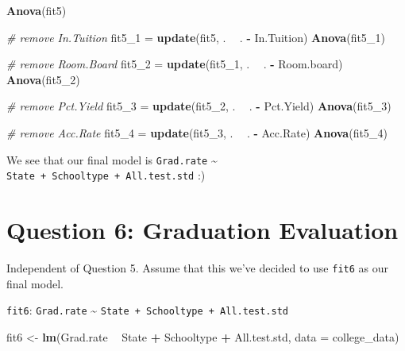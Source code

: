 \documentclass[]{article}
\newenvironment{Shaded}{\begin{snugshade}}{\end{snugshade}}
\newcommand{\KeywordTok}[1]{\textcolor[rgb]{0.13,0.29,0.53}{\textbf{#1}}}
\newcommand{\DataTypeTok}[1]{\textcolor[rgb]{0.13,0.29,0.53}{#1}}
\newcommand{\DecValTok}[1]{\textcolor[rgb]{0.00,0.00,0.81}{#1}}
\newcommand{\StringTok}[1]{\textcolor[rgb]{0.31,0.60,0.02}{#1}}
\newcommand{\CommentTok}[1]{\textcolor[rgb]{0.56,0.35,0.01}{\textit{#1}}}
\newcommand{\OperatorTok}[1]{\textcolor[rgb]{0.81,0.36,0.00}{\textbf{#1}}}
\newcommand{\NormalTok}[1]{#1}
\begin{document}
\begin{Shaded}
\begin{Highlighting}[]
\KeywordTok{Anova}\NormalTok{(fit5)}

\CommentTok{# remove In.Tuition}
\NormalTok{fit5_}\DecValTok{1}\NormalTok{ =}\StringTok{ }\KeywordTok{update}\NormalTok{(fit5, . }\OperatorTok{~}\StringTok{ }\NormalTok{. }\OperatorTok{-}\StringTok{ }\NormalTok{In.Tuition)}
\KeywordTok{Anova}\NormalTok{(fit5_}\DecValTok{1}\NormalTok{)}

\CommentTok{# remove Room.Board}
\NormalTok{fit5_}\DecValTok{2}\NormalTok{ =}\StringTok{ }\KeywordTok{update}\NormalTok{(fit5_}\DecValTok{1}\NormalTok{, . }\OperatorTok{~}\StringTok{ }\NormalTok{. }\OperatorTok{-}\StringTok{ }\NormalTok{Room.board)}
\KeywordTok{Anova}\NormalTok{(fit5_}\DecValTok{2}\NormalTok{)}

\CommentTok{# remove Pct.Yield}
\NormalTok{fit5_}\DecValTok{3}\NormalTok{ =}\StringTok{ }\KeywordTok{update}\NormalTok{(fit5_}\DecValTok{2}\NormalTok{, . }\OperatorTok{~}\StringTok{ }\NormalTok{. }\OperatorTok{-}\StringTok{ }\NormalTok{Pct.Yield)}
\KeywordTok{Anova}\NormalTok{(fit5_}\DecValTok{3}\NormalTok{)}

\CommentTok{# remove Acc.Rate}
\NormalTok{fit5_}\DecValTok{4}\NormalTok{ =}\StringTok{ }\KeywordTok{update}\NormalTok{(fit5_}\DecValTok{3}\NormalTok{, . }\OperatorTok{~}\StringTok{ }\NormalTok{. }\OperatorTok{-}\StringTok{ }\NormalTok{Acc.Rate)}
\KeywordTok{Anova}\NormalTok{(fit5_}\DecValTok{4}\NormalTok{)}
\end{Highlighting}
\end{Shaded}

We see that our final model is \texttt{Grad.rate} \textasciitilde{}
\texttt{State\ +\ Schooltype\ +\ All.test.std} :)

\section{Question 6: Graduation
Evaluation}\label{question-6-graduation-evaluation}

Independent of Question 5. Assume that this we've decided to use
\texttt{fit6} as our final model.

\texttt{fit6}: \texttt{Grad.rate} \textasciitilde{}
\texttt{State\ +\ Schooltype\ +\ All.test.std}

\begin{Shaded}
\begin{Highlighting}[]
\NormalTok{fit6 <-}\StringTok{ }\KeywordTok{lm}\NormalTok{(Grad.rate }\OperatorTok{~}\StringTok{ }\NormalTok{State }\OperatorTok{+}\StringTok{ }\NormalTok{Schooltype }\OperatorTok{+}\StringTok{ }\NormalTok{All.test.std, }\DataTypeTok{data =}\NormalTok{ college_data)}
\end{Highlighting}
\end{Shaded}
\end{document}
